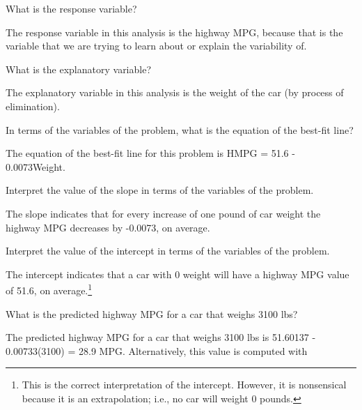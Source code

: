 \documentclass[10pt,openany]{book}\usepackage[]{graphicx}\usepackage[]{color}
\makeatletter
\newenvironment{kframe}{%
 \def\at@end@of@kframe{}%
 \ifinner\ifhmode%
  \def\at@end@of@kframe{\end{minipage}}%
  \begin{minipage}{\columnwidth}%
 \fi\fi%
 \def\FrameCommand##1{\hskip\@totalleftmargin \hskip-\fboxsep
 \colorbox{shadecolor}{##1}\hskip-\fboxsep
     \hskip-\linewidth \hskip-\@totalleftmargin \hskip\columnwidth}%
 \MakeFramed {\advance\hsize-\width
   \@totalleftmargin\z@ \linewidth\hsize
   \@setminipage}}%
 {\par\unskip\endMakeFramed%
 \at@end@of@kframe}
\newenvironment{knitrout}{}{} %
\makeatother
\begin{document}
\begin{QAlist}
  \item What is the response variable?
  \begin{QAlist}
    \item The response variable in this analysis is the highway MPG, because that is the variable that we are trying to learn about or explain the variability of.
  \end{QAlist}
  \item What is the explanatory variable?
  \begin{QAlist}
    \item The explanatory variable in this analysis is the weight of the car (by process of elimination).
  \end{QAlist}
  \item In terms of the variables of the problem, what is the equation of the best-fit line?
  \begin{QAlist}
    \item The equation of the best-fit line for this problem is HMPG = 51.6 - 0.0073Weight.
  \end{QAlist}
  \item Interpret the value of the slope in terms of the variables of the problem.
  \begin{QAlist}
    \item The slope indicates that for every increase of one pound of car weight the highway MPG decreases by -0.0073, on average.
  \end{QAlist}
  \item Interpret the value of the intercept in terms of the variables of the problem.
  \begin{QAlist}
    \item The intercept indicates that a car with 0 weight will have a highway MPG value of 51.6, on average.\footnote{This is the correct interpretation of the intercept.  However, it is nonsensical because it is an extrapolation; i.e., no car will weight 0 pounds.}
  \end{QAlist}
  \item What is the predicted highway MPG for a car that weighs 3100 lbs?
  \begin{QAlist}
    \item The predicted highway MPG for a car that weighs 3100 lbs is 51.60137 - 0.00733(3100) = 28.9 MPG.  Alternatively, this value is computed with
\begin{knitrout}
\color{fgcolor}\begin{kframe}

\end{kframe}
\end{knitrout}
\end{QAlist}
\end{QAlist}
\end{document}
